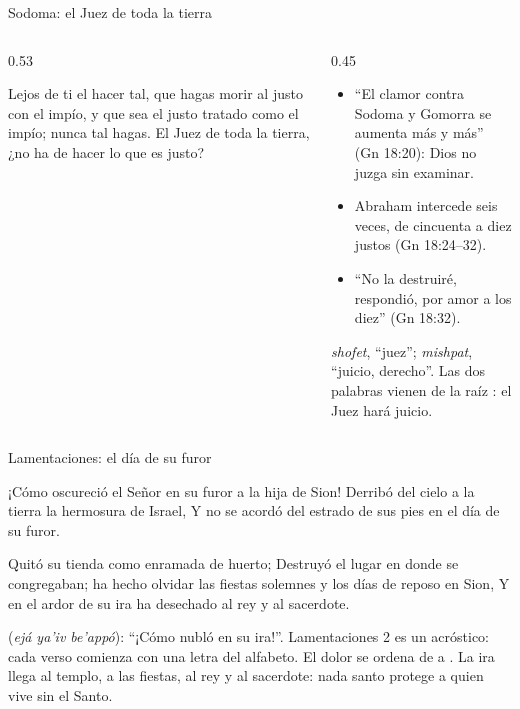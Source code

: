 \begin{frame}{Sodoma: el Juez de toda la tierra}
\begin{columns}[t,onlytextwidth]
\begin{column}{0.53\textwidth}
\begin{cita}Lejos de ti el hacer tal, que hagas morir al justo con el impío, y que sea el justo tratado como el impío; nunca tal hagas. El Juez de toda la tierra, ¿no ha de hacer lo que es justo?\end{cita}
\begin{center}\end{center}
\end{column}
\begin{column}{0.45\textwidth}\small
\begin{itemize}
\item ``El clamor contra Sodoma y Gomorra se aumenta más y más'' (Gn 18:20): Dios no juzga sin examinar.
\item Abraham intercede seis veces, de cincuenta a diez justos (Gn 18:24--32).
\item ``No la destruiré, respondió, por amor a los diez'' (Gn 18:32).
\end{itemize}
\scriptsize{} \emph{shofet}, ``juez'';  \emph{mishpat}, ``juicio, derecho''. Las dos palabras vienen de la raíz : el Juez hará juicio.
\end{column}
\end{columns}
\end{frame}

\begin{frame}{Lamentaciones: el día de su furor}
\begin{cita}¡Cómo oscureció el Señor en su furor a la hija de Sion! Derribó del cielo a la tierra la hermosura de Israel, Y no se acordó del estrado de sus pies en el día de su furor.\end{cita}
\begin{cita}Quitó su tienda como enramada de huerto; Destruyó el lugar en donde se congregaban; \SENOR{} ha hecho olvidar las fiestas solemnes y los días de reposo en Sion, Y en el ardor de su ira ha desechado al rey y al sacerdote.\end{cita}
\scriptsize{} (\emph{ejá ya'iv be'appó}): ``¡Cómo nubló en su ira!''. Lamentaciones 2 es un acróstico: cada verso comienza con una letra del alfabeto. El dolor se ordena de  a . La ira llega al templo, a las fiestas, al rey y al sacerdote: nada santo protege a quien vive sin el Santo.
\end{frame}

